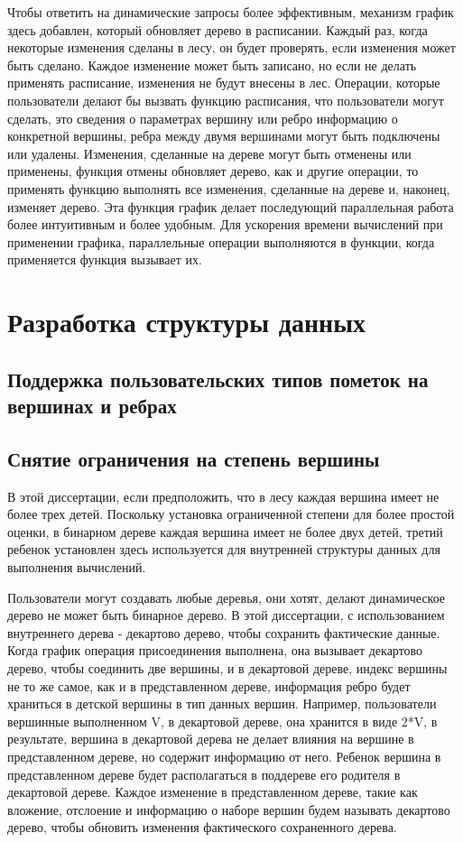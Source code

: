 \documentclass[specification,annotation]{itmo-student-thesis}
\newcommand{\revise}[1]{{\color{red!70!black} #1 }}
\begin{document}
\revise{
Чтобы ответить на динамические запросы более эффективным, механизм график здесь добавлен, который обновляет дерево в расписании. Каждый раз, когда некоторые изменения сделаны в лесу, он будет проверять, 
если изменения может быть сделано. Каждое изменение может быть записано, но если не делать применять расписание, изменения не будут внесены в лес. Операции, которые пользователи делают бы вызвать функцию 
расписания, что пользователи могут сделать, это сведения о параметрах вершину или ребро информацию о конкретной вершины, ребра между двумя вершинами могут быть подключены или удалены. Изменения, сделанные 
на дереве могут быть отменены или применены, функция отмены обновляет дерево, как и другие операции, то применять функцию выполнять все изменения, сделанные на дереве и, наконец, изменяет дерево. Эта 
функция график делает последующий параллельная работа более интуитивным и более удобным. Для ускорения времени вычислений при применении графика, параллельные операции выполняются в функции, когда 
применяется функция вызывает их.
}

\chapterconclusion

\chapter{Разработка структуры данных}

\section{Поддержка пользовательских типов пометок на вершинах и ребрах}

\section{Снятие ограничения на степень вершины}

\revise{
В этой диссертации, если предположить, что в лесу каждая вершина имеет не более трех детей. Поскольку установка ограниченной степени для более простой оценки, в бинарном дереве каждая вершина имеет не 
более двух детей, третий ребенок установлен здесь используется для внутренней структуры данных для выполнения вычислений.
}

\revise{
Пользователи могут создавать любые деревья, они хотят, делают динамическое дерево не может быть бинарное дерево. В этой диссертации, с использованием внутреннего дерева - декартово дерево, чтобы сохранить 
фактические данные. Когда график операция присоединения выполнена, она вызывает декартово дерево, чтобы соединить две вершины, и в декартовой дереве, индекс вершины не то же самое, как и в представленном 
дереве, информация ребро будет храниться в детской вершины в тип данных вершин. Например, пользователи вершинные выполненном V, в декартовой дереве, она хранится в виде 2*V, в результате, вершина в 
декартовой дерева не делает влияния на вершине в представленном дереве, но содержит информацию от него. Ребенок вершина в представленном дереве будет располагаться в поддереве его родителя в декартовой 
дереве. Каждое изменение в представленном дереве, такие как вложение, отслоение и информацию о наборе вершин будем называть декартово дерево, чтобы обновить изменения фактического сохраненного дерева.
}
\end{document}
